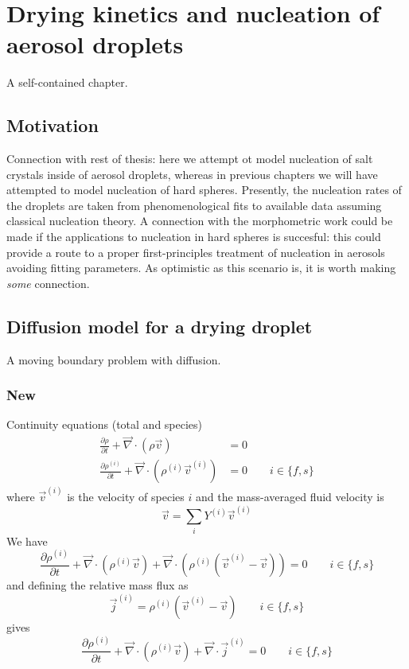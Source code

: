 \documentclass[12pt]{report}
\begin{document}
\chapter{Drying kinetics and nucleation of aerosol droplets}
A self-contained chapter.

\section{Motivation}
Connection with rest of thesis: here we attempt ot model nucleation of salt crystals inside of aerosol droplets, whereas in previous chapters we will have attempted to model nucleation of hard spheres.
Presently, the nucleation rates of the droplets are taken from phenomenological fits to available data assuming classical nucleation theory.
A connection with the morphometric work could be made if the applications to nucleation in hard spheres is succesful: this could provide a route to a proper first-principles treatment of nucleation in aerosols avoiding fitting parameters.
As optimistic as this scenario is, it is worth making \emph{some} connection.

\section{Diffusion model for a drying droplet}
A moving boundary problem with diffusion.

\subsection{New}

Continuity equations (total and species)
\begin{align}
  \label{eq:total-continuity}
  \frac{\partial \rho}{\partial t} +
  \vec{\nabla} \cdot (\rho \vec{v}) &= 0 \\
  \label{eq:species-continuity}
  \frac{\partial \rho^{(i)}}{\partial t} +
  \vec{\nabla} \cdot (\rho^{(i)} \vec{v}^{(i)}) &= 0
  \qquad i \in \{f,s\}
\end{align}
where $\vec{v}^{(i)}$ is the velocity of species $i$ and the mass-averaged fluid velocity is
\begin{equation}
  \vec{v} = \sum_i Y^{(i)} \vec{v}^{(i)}
\end{equation}
We have
\begin{equation*}
  \frac{\partial \rho^{(i)}}{\partial t} +
  \vec{\nabla} \cdot (\rho^{(i)} \vec{v}) +
  \vec{\nabla} \cdot (\rho^{(i)} (\vec{v}^{(i)} - \vec{v})) = 0
  \qquad i \in \{f,s\}
\end{equation*}
and defining the relative mass flux as
\begin{equation}\label{eq:relative-mass-flux}
  \vec{j}^{(i)} = \rho^{(i)} (\vec{v}^{(i)} - \vec{v})
  \qquad i \in \{f,s\}
\end{equation}
gives
\begin{equation}\label{eq:species-continuity-relative}
  \frac{\partial \rho^{(i)}}{\partial t} +
  \vec{\nabla} \cdot (\rho^{(i)} \vec{v}) +
  \vec{\nabla} \cdot \vec{j}^{(i)} = 0
  \qquad i \in \{f,s\}
\end{equation}
\end{document}
